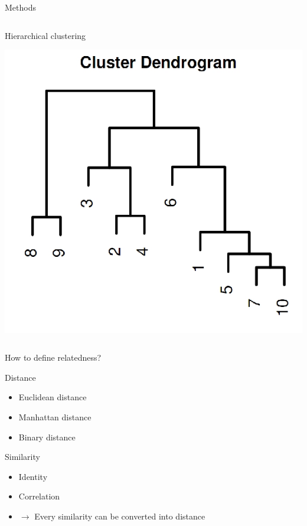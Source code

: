 \documentclass{beamer}\usepackage[]{graphicx}\usepackage[]{color}
\begin{document}
\begin{frame}[fragile]{Methods}
\begin{columns}[t]
\begin{column}{.32\linewidth}
\begin{block}{Hierarchical clustering}
\begin{center}
          \includegraphics[width=.6\linewidth]{clust_hier.png}
        \end{center}
      \end{block}
    \end{column}
  \end{columns}
\end{frame}

\begin{frame}[fragile]{How to define relatedness?}
  \begin{block}{Distance}
    \begin{itemize}
      \item Euclidean distance
      \item Manhattan distance
      \item Binary distance
    \end{itemize}
  \end{block}
  \begin{block}{Similarity}
    \begin{itemize}
      \item Identity
      \item Correlation
        \vspace{.3cm}
      \item $\rightarrow$ Every similarity can be converted into distance
    \end{itemize}
  \end{block}
\end{frame}
\end{document}

